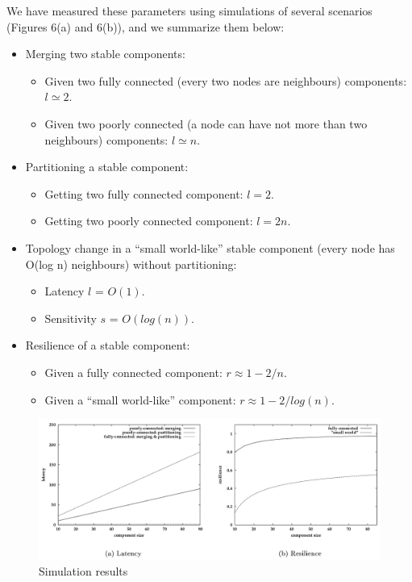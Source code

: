 We have measured these parameters using simulations of several scenarios (Figures 6(a) and 6(b)), and we summarize them below:

\begin{itemize}
	\item Merging two stable components:
	
	\begin{itemize}
		\item Given two fully connected (every two nodes are neighbours) components: $l \simeq 2$.
		\item Given two poorly connected (a node can have not more than two neighbours) components: $l \simeq n$.
	\end{itemize}
	
	\item Partitioning a stable component:
	
	\begin{itemize}
		\item Getting two fully connected component: $l = 2$.
		\item Getting two poorly connected component: $l = 2n$.
	\end{itemize}
	
	\item Topology change in a “small world-like” stable component (every node has O(log n) neighbours) without partitioning:
	\begin{itemize}
		\item Latency $l$ = $O(1)$.
		\item Sensitivity $s$ = $O(log(n))$.
	\end{itemize}
	
	\item Resilience of a stable component:
	
	\begin{itemize}
		\item Given a fully connected component: $r \approx 1 - 2/n$.
		\item Given a “small world-like” component: $r \approx 1 - 2/log(n)$.
	\end{itemize}
	
\end{itemize}


\begin{figure}[hbtp]
	\centering
	\includegraphics[scale=.4]{performance_test.png}
	\caption{Simulation results}
\end{figure}
